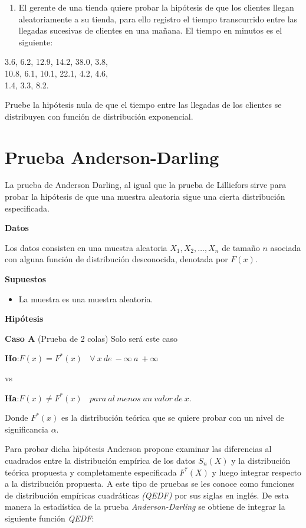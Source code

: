 \documentclass[a4paper,oneside,openany]{book}
\providecommand{\tightlist}{%
  \setlength{\itemsep}{0pt}\setlength{\parskip}{0pt}}
\begin{document}
\begin{enumerate}
\def\labelenumi{\arabic{enumi}.}
\tightlist
\item
  El gerente de una tienda quiere probar la hipótesis de que los
  clientes llegan aleatoriamente a su tienda, para ello registro el
  tiempo transcurrido entre las llegadas sucesivas de clientes en una
  mañana. El tiempo en minutos es el siguiente:
\end{enumerate}

3.6, 6.2, 12.9, 14.2, 38.0, 3.8,\\
10.8, 6.1, 10.1, 22.1, 4.2, 4.6,\\
1.4, 3.3, 8.2.

Pruebe la hipótesis nula de que el tiempo entre las llegadas de los
clientes se distribuyen con función de distribución exponencial.

\chapter{Prueba Anderson-Darling}\label{prueba-anderson-darling}

La prueba de Anderson Darling, al igual que la prueba de Lilliefors
sirve para probar la hipótesis de que una muestra aleatoria sigue una
cierta distribución especificada.

\textbf{Datos}

Los datos consisten en una muestra aleatoria
\(X_{1},X_{2},\ldots,X_{n}\) de tamaño \(n\) asociada con alguna función
de distribución desconocida, denotada por \(F(x)\).

\textbf{Supuestos}

\begin{itemize}
\tightlist
\item
  La muestra es una muestra aleatoria.
\end{itemize}

\textbf{Hipótesis}

\textbf{Caso A} (Prueba de 2 colas) Solo será este caso

\textbf{Ho}:\(F(x)=F^*(x) \ \ \ \ \forall\ x\  de\ -\infty \ a\  +\infty\)

vs

\textbf{Ha}:\(F(x) \neq F^*(x) \ \ \ \ para\ al\ menos\ un\  valor\ de\  x.\ \)

Donde \(F^*(x)\) es la distribución teórica que se quiere probar con un
nivel de significancia \(\alpha\).

Para probar dicha hipótesis Anderson propone examinar las diferencias al
cuadrados entre la distribución empírica de los datos \(S_{n}(X)\) y la
distribución teórica propuesta y completamente especificada \(F^*(X)\) y
luego integrar respecto a la distribución propuesta. A este tipo de
pruebas se les conoce como funciones de distribución empíricas
cuadráticas \emph{(QEDF)} por sus siglas en inglés. De esta manera la
estadística de la prueba \emph{Anderson-Darling} se obtiene de integrar
la siguiente función \emph{QEDF}:
\end{document}
